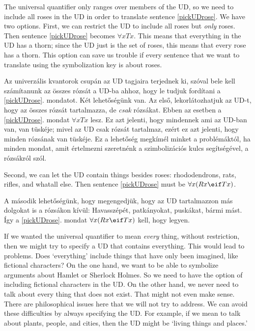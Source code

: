 
The universal quantifier only ranges over members of the UD, so we need to include all roses in the UD in order to translate sentence \ref{pickUDrose}. We have two options. First, we can restrict the UD to include all roses but \emph{only} roses. Then sentence \ref{pickUDrose} becomes $\forall x Tx$. This means that everything in the UD has a thorn; since the UD just is the set of roses, this means that every rose has a thorn. This option can save us trouble if every sentence that we want to translate using the symbolization key is about roses.

Az univerzális kvantorok csupán az UD tagjaira terjednek ki, szóval bele kell számítanunk az összes rózsát a UD-ba ahhoz, hogy le tudjuk fordítani a \ref{pickUDrose}. mondatot. Két lehetőségünk van. Az első, lekorlátozhatjuk az UD-t, hogy az összes rózsát tartalmazza, de \emph{csak} rózsákat. Ebben az esetben a \ref{pickUDrose}. mondat $\forall x Tx$ lesz. Ez azt jelenti, hogy mindennek ami az UD-ban van, van tüskéje; mivel az UD csak rózsát tartalmaz, ezért ez azt jelenti, hogy minden rózsának van tüskéje. Ez a lehetőség megkímél minket a problémáktól, ha minden mondat, amit értelmezni szeretnénk a szimbolizációs kulcs segítségével, a rózsákról szól.

Second, we can let the UD contain things besides roses: rhododendrons, rats, rifles, and whatall else. Then sentence \ref{pickUDrose} must be $\forall x(Rx \eif Tx)$.

A második lehetőségünk, hogy megengedjük, hogy az UD tartalmazzon más dolgokat is a rózsákon kívül: Havasszépét, patkányokat, puskákat, bármi mást. Így a \ref{pickUDrose}. mondat $\forall x(Rx \eif Tx)$ kell, hogy legyen.

If we wanted the universal quantifier to mean \emph{every} thing, without restriction, then we might try to specify a UD that contains everything. This would lead to problems. Does `everything' include things that have only been imagined, like fictional characters? On the one hand, we want to be able to symbolize arguments about Hamlet or Sherlock Holmes. So we need to have the option of including fictional characters in the UD. On the other hand, we never need to talk about every thing that does not exist. That might not even make sense. There are philosophical issues here that we will not try to address. We can avoid these difficulties by always specifying the UD. For example, if we mean to talk about plants, people, and cities, then the UD might be `living things and places.'

